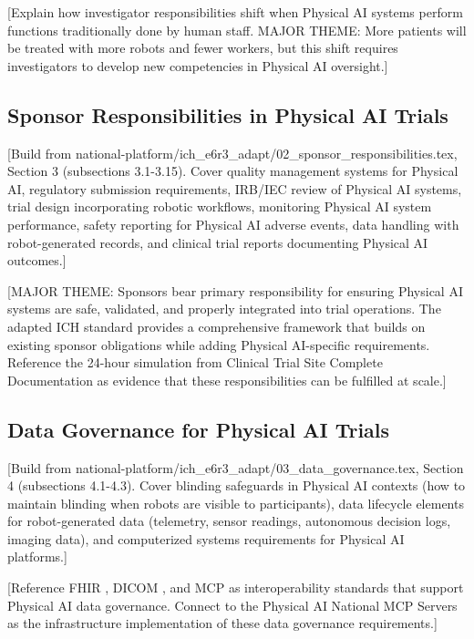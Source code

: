 [Explain how investigator responsibilities shift when Physical AI systems
perform functions traditionally done by human staff. MAJOR THEME: More patients
will be treated with more robots and fewer workers, but this shift requires
investigators to develop new competencies in Physical AI oversight.]

\subsection{Sponsor Responsibilities in Physical AI Trials}
\label{subsec:ich-sponsor}

[Build from national-platform/ich\_e6r3\_adapt/02\_sponsor\_responsibilities.tex,
Section 3 (subsections 3.1-3.15). Cover quality management systems for
Physical AI, regulatory submission requirements, IRB/IEC review of Physical AI
systems, trial design incorporating robotic workflows, monitoring Physical AI
system performance, safety reporting for Physical AI adverse events, data
handling with robot-generated records, and clinical trial reports documenting
Physical AI outcomes.]

[MAJOR THEME: Sponsors bear primary responsibility for ensuring Physical AI
systems are safe, validated, and properly integrated into trial operations.
The adapted ICH standard provides a comprehensive framework that builds on
existing sponsor obligations while adding Physical AI-specific requirements.
Reference the 24-hour simulation from Clinical Trial Site Complete
Documentation \cite{site-docs} as evidence that these responsibilities can be
fulfilled at scale.]

\subsection{Data Governance for Physical AI Trials}
\label{subsec:ich-data-governance}

[Build from national-platform/ich\_e6r3\_adapt/03\_data\_governance.tex,
Section 4 (subsections 4.1-4.3). Cover blinding safeguards in Physical AI
contexts (how to maintain blinding when robots are visible to participants),
data lifecycle elements for robot-generated data (telemetry, sensor readings,
autonomous decision logs, imaging data), and computerized systems requirements
for Physical AI platforms.]

[Reference FHIR \cite{hl7-fhir}, DICOM \cite{dicom}, and MCP
\cite{mcp-protocol} as interoperability standards that support Physical AI
data governance. Connect to the Physical AI National MCP Servers
\cite{national-mcp-paper} as the infrastructure implementation of these data
governance requirements.]

